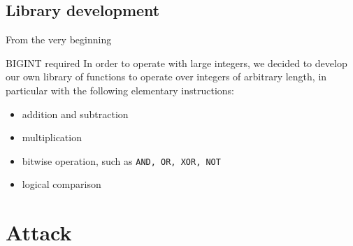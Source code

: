 \documentclass{beamer}
\begin{document}
\subsection{Library development}
\begin{frame}{From the very beginning}
	\begin{block}{BIGINT required}
		In order to operate with large integers, we decided to develop our own library of functions to operate over integers of arbitrary length, in particular with the following elementary instructions:
		\begin{itemize}
			\item addition and subtraction
			\item multiplication
			\item bitwise operation, such as \texttt{AND, OR, XOR, NOT}
			\item logical comparison
		\end{itemize}
	\end{block}
\end{frame}


\section{Attack}
\end{document}
